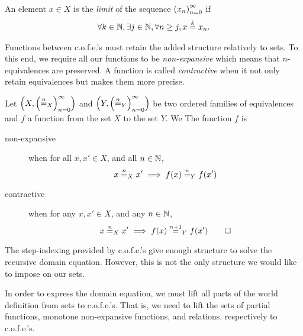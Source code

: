 \begin{jversion}
\begin{definition}
  An element $x \in X$ is the \emph{limit} of the sequence $\seq{x}$ if
  \begin{align*}
    \forall k \in \nats, \exists j \in \nats, \forall n \geq j, x \nequal[k] x_n.
  \end{align*}
\end{definition}
Functions between c.o.f.e.'s must retain the added structure relatively to sets.
To this end, we require all our functions to be \emph{non-expansive} which means that $n$-equivalences are preserved.
A function is called \emph{contractive} when it not only retain equivalences but makes them more precise.
\begin{definition}
  \label{def:nonexpansive-contractive-ofe}
  Let $\left(X,\left(\nequal[n]_X\right)_{n=0}^{\infty} \right)$ and $\left(Y,\left(\nequal[n]_Y\right)_{n=0}^{\infty} \right)$ be two ordered families of equivalences and $f$ a function from the set $X$ to the set $Y$.
  We 
  The function $f$ is
  \begin{description}
  \item[non-expansive] when for all $x, x' \in X$, and all $n \in \nats$,
\[
  x \nequal_X x' \implies f(x) \nequal_Y f(x')
\]
  \item[contractive] when for any $x, x' \in X$, and any $n \in \nats$,
\[
  x \nequal_X x' \implies f(x) \nequal[n+1]_Y f(x') 
  \qedhere
\]
  \end{description}
\end{definition}
\noindent The step-indexing provided by c.o.f.e.'s give enough structure to solve the recursive domain equation.
However, this is not the only structure we would like to impose on our sets.

In order to express the domain equation, we must lift all parts of the world definition from sets to c.o.f.e.'s.
That is, we need to lift the sets of partial functions, monotone non-expansive functions, and relations, respectively to c.o.f.e.'s.


\end{jversion}
